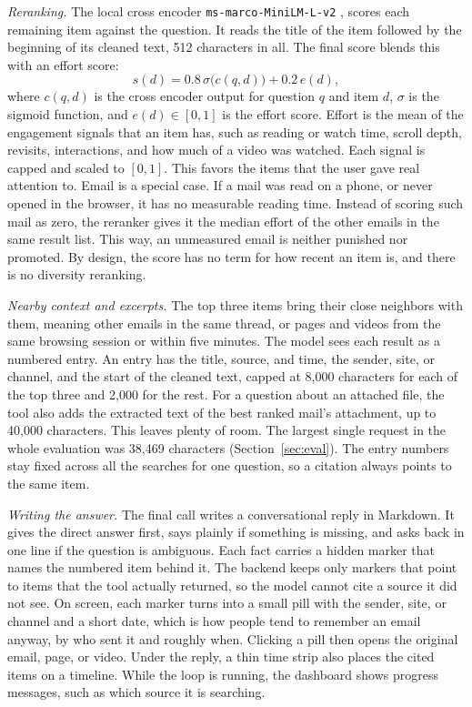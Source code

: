 \documentclass[conference]{IEEEtran}
\newcommand{\rerankmodel}{\texttt{ms\allowbreak-marco\allowbreak-MiniLM\allowbreak-L\allowbreak-6\allowbreak-v2}}
\begin{document}
\textit{Reranking.} The local cross encoder \rerankmodel{} \cite{b10}, \cite{b11} scores each remaining item against the question. It reads the title of the item followed by the beginning of its cleaned text, 512 characters in all. The final score blends this with an effort score:
\begin{equation}
s(d) = 0.8\,\sigma\big(c(q,d)\big) + 0.2\,e(d), \label{eq:final}
\end{equation}
where $c(q,d)$ is the cross encoder output for question $q$ and item $d$, $\sigma$ is the sigmoid function, and $e(d) \in [0,1]$ is the effort score. Effort is the mean of the engagement signals that an item has, such as reading or watch time, scroll depth, revisits, interactions, and how much of a video was watched. Each signal is capped and scaled to $[0,1]$. This favors the items that the user gave real attention to. Email is a special case. If a mail was read on a phone, or never opened in the browser, it has no measurable reading time. Instead of scoring such mail as zero, the reranker gives it the median effort of the other emails in the same result list. This way, an unmeasured email is neither punished nor promoted. By design, the score has no term for how recent an item is, and there is no diversity reranking.

\textit{Nearby context and excerpts.} The top three items bring their close neighbors with them, meaning other emails in the same thread, or pages and videos from the same browsing session or within five minutes. The model sees each result as a numbered entry. An entry has the title, source, and time, the sender, site, or channel, and the start of the cleaned text, capped at 8,000 characters for each of the top three and 2,000 for the rest. For a question about an attached file, the tool also adds the extracted text of the best ranked mail's attachment, up to 40,000 characters. This leaves plenty of room. The largest single request in the whole evaluation was 38,469 characters (Section~\ref{sec:eval}). The entry numbers stay fixed across all the searches for one question, so a citation always points to the same item.

\textit{Writing the answer.} The final call writes a conversational reply in Markdown. It gives the direct answer first, says plainly if something is missing, and asks back in one line if the question is ambiguous. Each fact carries a hidden marker that names the numbered item behind it. The backend keeps only markers that point to items that the tool actually returned, so the model cannot cite a source it did not see. On screen, each marker turns into a small pill with the sender, site, or channel and a short date, which is how people tend to remember an email anyway, by who sent it and roughly when. Clicking a pill then opens the original email, page, or video. Under the reply, a thin time strip also places the cited items on a timeline. While the loop is running, the dashboard shows progress messages, such as which source it is searching.
\end{document}

